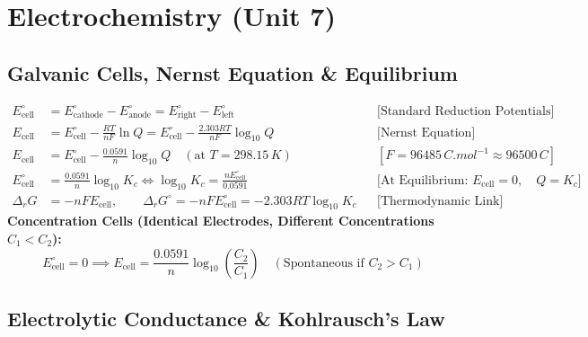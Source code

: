 \documentclass[11pt,a4paper]{article}
\begin{document}
\newpage

\section{Electrochemistry (Unit 7)}

\subsection{Galvanic Cells, Nernst Equation \& Equilibrium}

\begin{formulabox}
\begin{align}
  E_{\text{cell}}^\circ &= E_{\text{cathode}}^\circ - E_{\text{anode}}^\circ = E_{\text{right}}^\circ - E_{\text{left}}^\circ && \text{[Standard Reduction Potentials]} \\
  E_{\text{cell}} &= E_{\text{cell}}^\circ - \frac{R T}{n F}\ln Q = E_{\text{cell}}^\circ - \frac{2.303 R T}{n F}\log_{10} Q && \text{[Nernst Equation]} \\
  E_{\text{cell}} &= E_{\text{cell}}^\circ - \frac{0.0591}{n}\log_{10} Q \quad (\text{at } T = 298.15\,\si{K}) && [F = 96485\,\si{C.mol^{-1}} \approx 96500\,\si{C}] \\
  E_{\text{cell}}^\circ &= \frac{0.0591}{n}\log_{10} K_c \iff \log_{10} K_c = \frac{n E_{\text{cell}}^\circ}{0.0591} && \text{[At Equilibrium: } E_{\text{cell}} = 0, \quad Q = K_c\text{]} \\
  \Delta_r G &= -n F E_{\text{cell}}, \qquad \Delta_r G^\circ = -n F E_{\text{cell}}^\circ = -2.303 R T \log_{10} K_c && \text{[Thermodynamic Link]}
\end{align}
\textbf{Concentration Cells (Identical Electrodes, Different Concentrations $C_1 < C_2$):}
\begin{equation}
  E_{\text{cell}}^\circ = 0 \implies E_{\text{cell}} = \frac{0.0591}{n}\log_{10}\left(\frac{C_2}{C_1}\right) \quad (\text{Spontaneous if } C_2 > C_1)
\end{equation}
\end{formulabox}

\subsection{Electrolytic Conductance \& Kohlrausch's Law}
\end{document}
